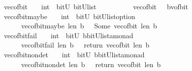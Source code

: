 \begin{isabellebody}
{}\isanewline
{}\isamarkupfalse%
\ vec{\isacharunderscore}of{\isacharunderscore}bit\ \ {\isacharcolon}{\isacharcolon}\ {\isachardoublequoteopen}\ int\ {\isasymRightarrow}\ bitU\ {\isasymRightarrow}{\isacharparenleft}bitU{\isacharparenright}list\ {\isachardoublequoteclose}\ \ \ \isanewline
\ \ \ \ \ {\isachardoublequoteopen}\ vec{\isacharunderscore}of{\isacharunderscore}bit\ {\isacharequal}\ {\isacharparenleft}\ bv{\isacharunderscore}of{\isacharunderscore}bit\ {\isacharparenright}{\isachardoublequoteclose}\isanewline
\isanewline
{}\isamarkupfalse%
\ vec{\isacharunderscore}of{\isacharunderscore}bit{\isacharunderscore}maybe\ \ {\isacharcolon}{\isacharcolon}\ {\isachardoublequoteopen}\ int\ {\isasymRightarrow}\ bitU\ {\isasymRightarrow}{\isacharparenleft}{\isacharparenleft}bitU{\isacharparenright}list{\isacharparenright}option\ {\isachardoublequoteclose}\ \ \ \isanewline
\ \ \ \ \ {\isachardoublequoteopen}\ vec{\isacharunderscore}of{\isacharunderscore}bit{\isacharunderscore}maybe\ len\ b\ {\isacharequal}\ {\isacharparenleft}\ Some\ {\isacharparenleft}vec{\isacharunderscore}of{\isacharunderscore}bit\ len\ b{\isacharparenright}{\isacharparenright}{\isachardoublequoteclose}\isanewline
\isanewline
{}\isamarkupfalse%
\ vec{\isacharunderscore}of{\isacharunderscore}bit{\isacharunderscore}fail\ \ {\isacharcolon}{\isacharcolon}\ {\isachardoublequoteopen}\ int\ {\isasymRightarrow}\ bitU\ {\isasymRightarrow}{\isacharparenleft}{\isacharprime}b{\isacharcomma}{\isacharparenleft}{\isacharparenleft}bitU{\isacharparenright}list{\isacharparenright}{\isacharcomma}{\isacharprime}a{\isacharparenright}monad\ {\isachardoublequoteclose}\ \ \ \isanewline
\ \ \ \ \ {\isachardoublequoteopen}\ vec{\isacharunderscore}of{\isacharunderscore}bit{\isacharunderscore}fail\ len\ b\ {\isacharequal}\ {\isacharparenleft}\ return\ {\isacharparenleft}vec{\isacharunderscore}of{\isacharunderscore}bit\ len\ b{\isacharparenright}{\isacharparenright}{\isachardoublequoteclose}\isanewline
\isanewline
{}\isamarkupfalse%
\ vec{\isacharunderscore}of{\isacharunderscore}bit{\isacharunderscore}nondet\ \ {\isacharcolon}{\isacharcolon}\ {\isachardoublequoteopen}\ int\ {\isasymRightarrow}\ bitU\ {\isasymRightarrow}{\isacharparenleft}{\isacharprime}b{\isacharcomma}{\isacharparenleft}{\isacharparenleft}bitU{\isacharparenright}list{\isacharparenright}{\isacharcomma}{\isacharprime}a{\isacharparenright}monad\ {\isachardoublequoteclose}\ \ \ \isanewline
\ \ \ \ \ {\isachardoublequoteopen}\ vec{\isacharunderscore}of{\isacharunderscore}bit{\isacharunderscore}nondet\ len\ b\ {\isacharequal}\ {\isacharparenleft}\ return\ {\isacharparenleft}vec{\isacharunderscore}of{\isacharunderscore}bit\ len\ b{\isacharparenright}{\isacharparenright}{\isachardoublequoteclose}\isanewline

\end{isabellebody}
